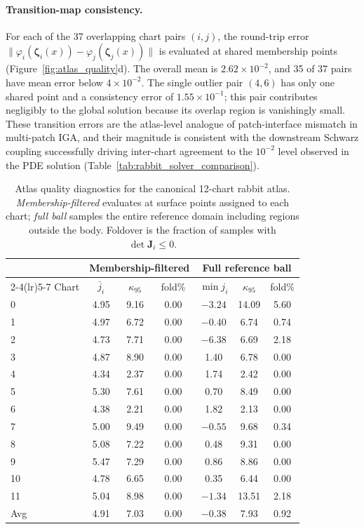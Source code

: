 \documentclass[sort&compress]{svjour3} %
\begin{document}
\paragraph{Transition-map consistency.}
For each of the 37 overlapping chart pairs $(i,j)$, the round-trip error $\|\varphi_i(\boldsymbol{\zeta}_i(x))-\varphi_j(\boldsymbol{\zeta}_j(x))\|$ is evaluated at shared membership points (Figure~\ref{fig:atlas_quality}d).
The overall mean is $2.62\times10^{-2}$, and 35 of 37 pairs have mean error below $4\times10^{-2}$.
The single outlier pair $(4,6)$ has only one shared point and a consistency error of $1.55\times10^{-1}$; this pair contributes negligibly to the global solution because its overlap region is vanishingly small.
These transition errors are the atlas-level analogue of patch-interface mismatch in multi-patch IGA, and their magnitude is consistent with the downstream Schwarz coupling successfully driving inter-chart agreement to the $10^{-2}$ level observed in the PDE solution (Table~\ref{tab:rabbit_solver_comparison}).

\begin{table}[htbp]
\centering
\caption{Atlas quality diagnostics for the canonical 12-chart rabbit atlas.
\emph{Membership-filtered} evaluates at surface points assigned to each chart;
\emph{full ball} samples the entire reference domain including regions outside the body.
Foldover is the fraction of samples with $\det\mathbf{J}_i \leq 0$.}
\label{tab:atlas_diagnostics}
\smallskip
\small
\begin{tabular}{lcccccc}
\toprule
 & \multicolumn{3}{c}{Membership-filtered} & \multicolumn{3}{c}{Full reference ball} \\
\cmidrule(lr){2-4}\cmidrule(lr){5-7}
Chart & $\bar{j}_i$ & $\kappa_{95}$ & fold\% & $\min j_i$ & $\kappa_{95}$ & fold\% \\
\midrule
0  & 4.95 & 9.16  & 0.00 & $-3.24$ & 14.09 & 5.60 \\
1  & 4.97 & 6.72  & 0.00 & $-0.40$ &  6.74 & 0.74 \\
2  & 4.73 & 7.71  & 0.00 & $-6.38$ &  6.69 & 2.18 \\
3  & 4.87 & 8.90  & 0.00 &  1.40   &  6.78 & 0.00 \\
4  & 4.34 & 2.37  & 0.00 &  1.74   &  2.42 & 0.00 \\
5  & 5.30 & 7.61  & 0.00 &  0.70   &  8.49 & 0.00 \\
6  & 4.38 & 2.21  & 0.00 &  1.82   &  2.13 & 0.00 \\
7  & 5.00 & 9.49  & 0.00 & $-0.55$ &  9.68 & 0.34 \\
8  & 5.08 & 7.22  & 0.00 &  0.48   &  9.31 & 0.00 \\
9  & 5.47 & 7.29  & 0.00 &  0.86   &  8.86 & 0.00 \\
10 & 4.78 & 6.65  & 0.00 &  0.35   &  6.44 & 0.00 \\
11 & 5.04 & 8.98  & 0.00 & $-1.34$ & 13.51 & 2.18 \\
\midrule
Avg & 4.91 & 7.03 & 0.00 & $-0.38$ &  7.93 & 0.92 \\
\bottomrule
\end{tabular}
\end{table}
\end{document}

